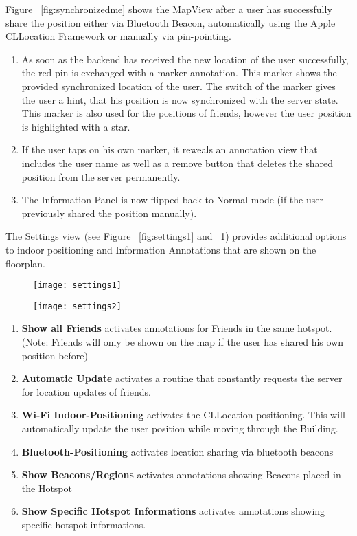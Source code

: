 Figure ~\ref{fig:synchronizedme} shows the MapView after a user has successfully share the position either via Bluetooth Beacon, automatically using the Apple CLLocation Framework or manually via pin-pointing.


\begin{enumerate}
\item As soon as the backend has received the new location of the user successfully, the red pin is exchanged with a marker annotation. This marker shows the provided synchronized location of the user. The switch of the marker gives the user a hint, that his position is now synchronized with the server state. This marker is also used for the positions of friends, however the user position is highlighted with a star.
\item If the user taps on his own marker, it reweals an annotation view that includes the user name as well as a remove button that deletes the shared position from the server permanently.

\item The Information-Panel is now flipped back to Normal mode (if the user previously shared the position manually).
\end{enumerate}


The Settings view (see Figure ~\ref{fig:settings1} and ~\ref{fig:settings2}) provides additional options to indoor positioning and Information Annotations that are shown on the floorplan.

\begin{figure}
\centering
\begin{minipage}{.5\textwidth}
  \centering
  \texttt{[image: settings1]}
  \label{fig:settings1}
\end{minipage}%
\begin{minipage}{.5\textwidth}
  \centering
  \texttt{[image: settings2]}
  \label{fig:settings2}
\end{minipage}
\end{figure}

\begin{enumerate}
\item \textbf{Show all Friends} activates annotations for Friends in the same hotspot. (Note: Friends will only be shown on the map if the user has shared his own position before)
\item \textbf{Automatic Update} activates a routine that constantly requests the server for location updates of friends. 
\item \textbf{Wi-Fi Indoor-Positioning} activates the CLLocation positioning. This will automatically update the user position while moving through the Building.
\item \textbf{Bluetooth-Positioning} activates location sharing via bluetooth beacons
\item \textbf{Show Beacons/Regions} activates annotations showing Beacons placed in the Hotspot
\item \textbf{Show Specific Hotspot Informations} activates annotations showing specific hotspot informations.
\end{enumerate}

